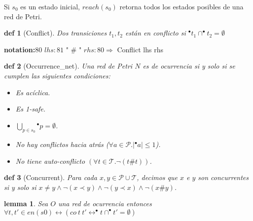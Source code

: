 \documentclass{article}
\newtheorem{defi}{def}
\newtheorem{lem}{lemma}
\newtheorem{fun}{fun}
\newcommand{\Tr}{\mathcal{T}}
\newcommand{\Pl}{\mathcal{P}}
\begin{document}

Si $s_0$ es un estado inicial, $reach(s_0)$ retorna todos los estados posibles de una red de Petri.

\begin{defi}[Conflict]\rm{Dos transiciones $t_1,t_2$ están en conflicto si } $ ^{\bullet}t_1\cap ^{\bullet}t_2=\emptyset$
\end{defi}

\textbf{notation:}80 $lhs:81$ " \# "  $rhs:80\Rightarrow$ Conflict lhs rhs

\begin{defi}[Occurrence\_net]\rm{Una red de Petri $N$ es de ocurrencia si y solo si se cumplen las siguientes condiciones:} 
\begin{itemize}
	\item Es acíclica. 
	\item Es 1-safe. 
	\item $\displaystyle\bigcup_{p\in s_0}{^{\bullet}p}=\emptyset$.
	\item No hay conflictos hacia atrás ($\forall a\in \Pl. |^{\bullet} a|\le 1$). 
	\item No tiene auto-conflicto $(\forall t\in \Tr.\neg (t\# t))$.
\end{itemize}
\end{defi}

\begin{defi}[Concurrent] \rm{Para cada $x,y\in \Pl\cup \Tr$, decimos que $x$ e $y$ son concurrentes si y solo si $ x\neq y\wedge \neg (x\prec y) \wedge \neg(y\prec x) \wedge \neg(x\# y)$}.
\end{defi}


\begin{lem} Sea $O$ una red de ocurrencia entonces $\forall t,t'\in en(s0) \leftrightarrow (co \ t \ t' \leftrightarrow ^{\bullet}t\cap ^{\bullet}t'=\emptyset)$
\end{lem}
\end{document}
